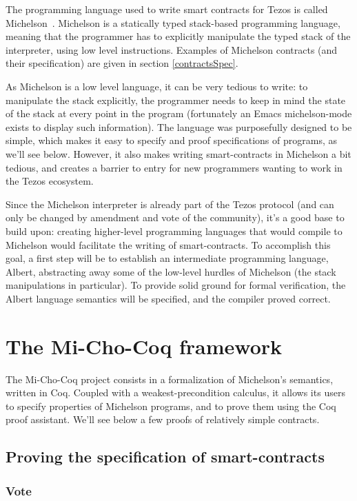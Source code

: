\documentclass{report}
\begin{document}
The programming language used to write smart contracts for Tezos is called Michelson~\cite{michelsonwhitedoc}. Michelson is a statically typed stack-based programming language, meaning that the programmer has to explicitly manipulate the typed stack of the interpreter, using low level instructions. Examples of Michelson contracts (and their specification) are given in section \ref{contractsSpec}.

As Michelson is a low level language, it can be very tedious to write: to manipulate the stack explicitly, the programmer needs to keep in mind the state of the stack at every point in the program (fortunately an Emacs michelson-mode exists to display such information). The language was purposefully designed to be simple, which makes it easy to specify and proof specifications of programs, as we'll see below. However, it also makes writing smart-contracts in Michelson a bit tedious, and creates a barrier to entry for new programmers wanting to work in the Tezos ecosystem.

Since the Michelson interpreter is already part of the Tezos protocol (and can only be changed by amendment and vote of the community), it's a good base to build upon: creating higher-level programming languages that would compile to Michelson would facilitate the writing of smart-contracts. To accomplish this goal, a first step will be to establish an intermediate programming language, Albert, abstracting away some of the low-level hurdles of Michelson (the stack manipulations in particular). To provide solid ground for formal verification, the Albert language semantics will be specified, and the compiler proved correct.

\chapter{The Mi-Cho-Coq framework}

The Mi-Cho-Coq project consists in a formalization of Michelson's semantics, written in Coq. Coupled with a weakest-precondition calculus, it allows its users to specify properties of Michelson programs, and to prove them using the Coq proof assistant. We'll see below a few proofs of relatively simple contracts.

\section{Proving the specification of smart-contracts}

\subsection{Vote}
\end{document}
